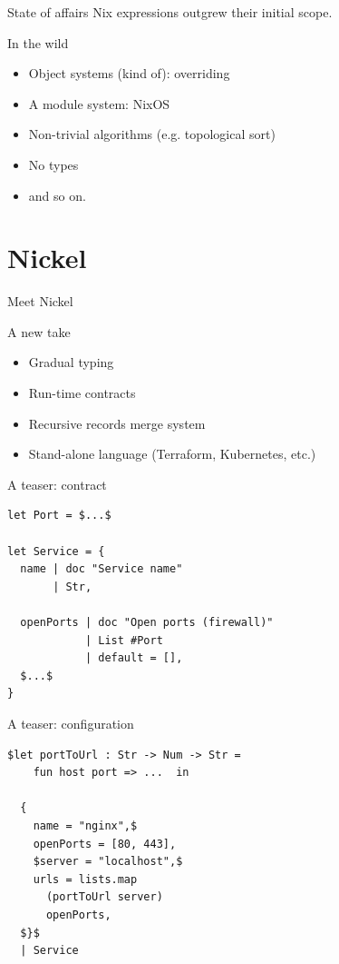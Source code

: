 \documentclass[t, aspectratio=169]{beamer}
\begin{document}
\begin{frame}{State of affairs}
    Nix expressions outgrew their initial scope.

    \begin{exampleblock}{In the wild}
      \begin{itemize}
        \item Object systems (kind of): overriding
        \item A module system: NixOS
        \item Non-trivial algorithms (e.g. topological sort)
        \item No types
        \item and so on.
      \end{itemize}
    \end{exampleblock}
\end{frame}

\section{Nickel}

\begin{frame}{Meet Nickel}
    \begin{block}{A new take}
        \begin{itemize}
            \item Gradual typing
            \item Run-time contracts
            \item Recursive records merge system
            \item Stand-alone language (Terraform, Kubernetes, etc.)
        \end{itemize}
    \end{block}
\end{frame}

\begin{frame}[fragile]{A teaser: contract}
\begin{lstlisting}[language=Nickel,title={contracts.ncl}]
let Port = $...$

let Service = {
  name | doc "Service name"
       | Str,

  openPorts | doc "Open ports (firewall)"
            | List #Port
            | default = [],
  $...$
}
\end{lstlisting}
\end{frame}

\begin{frame}[fragile]{A teaser: configuration}
\begin{lstlisting}[language=Nickel,title={nginx.ncl}]
  $let portToUrl : Str -> Num -> Str =
    fun host port => ...  in

  {
    name = "nginx",$
    openPorts = [80, 443],
    $server = "localhost",$
    urls = lists.map
      (portToUrl server)
      openPorts,
  $}$
  | Service
\end{lstlisting}
\end{frame}
\end{document}
